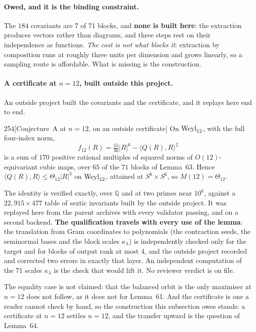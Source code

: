 \paragraph{Owed, and it is the binding constraint.} The $184$ covariants are $7$ of $71$ blocks, and \textbf{none is built here}: the extraction produces vectors rather than diagrams, and three steps rest on their independence as functions. \emph{The cost is not what blocks it}: extraction by composition runs at roughly three units per dimension and grows linearly, so a sampling route is affordable. What is missing is the construction.

\paragraph{A certificate at $n=12$, built outside this project.} An outside project built the covariants and the certificate, and it replays here end to end.

\begin{Lem}{254}[Conjecture~A at $n=12$, on an outside certificate]
On $\mathrm{Weyl}_{12}$, with the full four-index norm,
\[
f_{12}(R)=\tfrac{55}{36}\lvert R\rvert^6-\langle Q(R),R\rangle^2
\]
is a sum of $170$ positive rational multiples of squared norms of $O(12)$-equivariant cubic maps, over $65$ of the $71$ blocks of Lemma~63. Hence $\langle Q(R),R\rangle\le\Theta_{12}\lvert R\rvert^3$ on $\mathrm{Weyl}_{12}$, attained at $S^6\times S^6$, so $M(12)=\Theta_{12}$.
\end{Lem}

\begin{certificate}
The identity is verified exactly, over $\mathbb Q$ and at two primes near $10^6$, against a $22{,}915\times477$ table of sextic invariants built by the outside project. It was replayed here from the parent archives with every validator passing, and on a second backend. \textbf{The qualification travels with every use of the lemma}: the translation from Gram coordinates to polynomials (the contraction seeds, the seminormal bases and the block scales $\kappa_\lambda$) is independently checked only for the target and for blocks of output rank at most $4$, and the outside project recorded and corrected two errors in exactly that layer. An independent computation of the $71$ scales $\kappa_\lambda$ is the check that would lift it. No reviewer verdict is on file.
\end{certificate}

The equality case is not claimed: that the balanced orbit is the only maximiser at $n=12$ does not follow, as it does not for Lemma~61. And the certificate is one a reader cannot check by hand, so the construction this subsection owes stands: a certificate at $n=12$ settles $n=12$, and the transfer upward is the question of Lemma~64.

